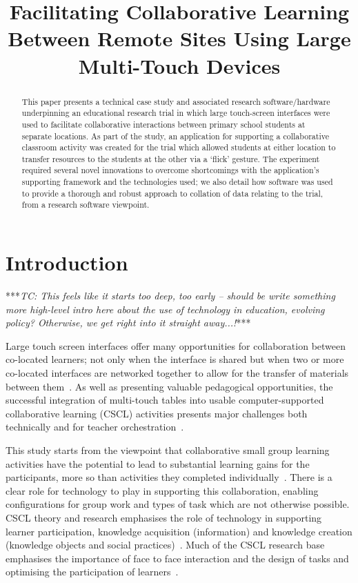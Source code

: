 \documentclass[twocolumn]{svjour3}          %
\title{Facilitating Collaborative Learning Between Remote Sites Using Large Multi-Touch Devices}
\date{ }
\begin{document}
\maketitle

\begin{abstract}
This paper presents a technical case study and associated research software/hardware underpinning an educational research trial in which large touch-screen interfaces were used to facilitate collaborative interactions between primary school students at separate locations.
As part of the study, an application for supporting a collaborative classroom activity was created for the trial which allowed students at either location to transfer resources to the students at the other via a `flick' gesture.
The experiment required several novel innovations to overcome shortcomings with the application's supporting framework and the technologies used; we also detail how software was used to provide a thorough and robust approach to collation of data relating to the trial, from a research software viewpoint.
\end{abstract}

\section{Introduction}

***{\emph{TC: This feels like it starts too deep, too early -- should be write something more high-level intro here about the use of technology in education, evolving policy? Otherwise, we get right into it straight away...!}}***

Large touch screen interfaces offer many opportunities for collaboration between co-located learners; not only when the interface is shared but when two or more co-located interfaces are networked together to allow for the transfer of materials between them~\citep{kharrufa:2013,kreitmayer:2013}.
As well as presenting valuable pedagogical opportunities, the successful integration of multi-touch tables into usable computer-supported collaborative learning (CSCL) activities presents major challenges both technically and for teacher orchestration~\citep{dillenbourg:2011}. 

This study starts from the viewpoint that collaborative small group learning activities have the potential to lead to substantial learning gains for the participants, more so than activities they completed individually~\citep{odonnell:2013,barron:2008}.
There is a clear role for technology to play in supporting this collaboration, enabling configurations for group work and types of task which are not otherwise possible.
CSCL theory and research emphasises the role of technology in supporting learner participation, knowledge acquisition (information) and knowledge creation (knowledge objects and social practices)~\citep{lipponen:2004}.
Much of the CSCL research base emphasises the importance of face to face interaction and the design of tasks and optimising the participation of learners~\citep{stahl:2014}.
\end{document}
